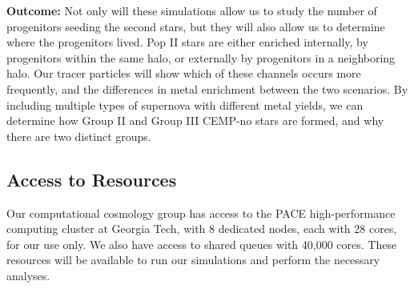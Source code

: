 \documentclass[letterpaper, 12pt]{article}
\begin{document}
\textbf{Outcome:} Not only will these simulations allow us to study the number of progenitors seeding the second stars, but they will also allow us to determine where the progenitors lived. Pop II stars are either enriched internally, by progenitors within the same halo, or externally by progenitors in a neighboring halo. Our tracer particles will show which of these channels occurs more frequently, and the differences in metal enrichment between the two scenarios. By including multiple types of supernova with different metal yields, we can determine how Group II and Group III CEMP-no stars are formed, and why there are two distinct groups.



\subsection*{Access to Resources}

Our computational cosmology group has access to the PACE high-performance computing cluster at Georgia Tech, with 8 dedicated nodes, each with 28 cores, for our use only. We also have access to shared queues with 40,000 cores. These resources will be available to run our simulations and perform the necessary analyses. 
\end{document}
